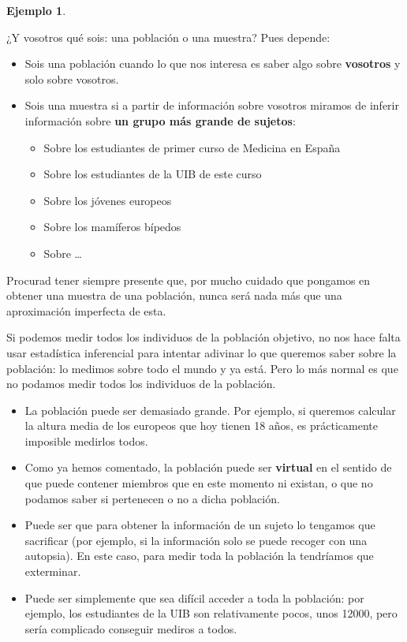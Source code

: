 \documentclass[
]{book}
\providecommand{\tightlist}{%
  \setlength{\itemsep}{0pt}\setlength{\parskip}{0pt}}
\theoremstyle{definition}
\theoremstyle{definition}
\newtheorem{example}{Ejemplo}[chapter]
\theoremstyle{definition}
\theoremstyle{definition}
\theoremstyle{remark}
\begin{document}
\begin{example}
\protect\hypertarget{exm:unnamed-chunk-58}{}\label{exm:unnamed-chunk-58}

¿Y vosotros qué sois: una población o una muestra? Pues depende:

\begin{itemize}
\item
  Sois una población cuando lo que nos interesa es saber algo sobre \textbf{vosotros} y solo sobre vosotros.
\item
  Sois una muestra si a partir de información sobre vosotros miramos de inferir información sobre \textbf{un grupo más grande de sujetos}:

  \begin{itemize}
  \tightlist
  \item
    Sobre los estudiantes de primer curso de Medicina en España
  \item
    Sobre los estudiantes de la UIB de este curso
  \item
    Sobre los jóvenes europeos
  \item
    Sobre los mamíferos bípedos
  \item
    Sobre \ldots{}
  \end{itemize}
\end{itemize}

\end{example}

\begin{rmdrecordau}
Procurad tener siempre presente que, por mucho cuidado que pongamos en obtener una muestra de una población, nunca será nada más que una aproximación imperfecta de esta.
\end{rmdrecordau}

Si podemos medir todos los individuos de la población objetivo, no nos hace falta usar estadística inferencial para intentar adivinar lo que queremos saber sobre la población: lo medimos sobre todo el mundo y ya está. Pero lo más normal es que no podamos medir todos los individuos de la población.

\begin{itemize}
\item
  La población puede ser demasiado grande. Por ejemplo, si queremos calcular la altura media de los europeos que hoy tienen 18 años, es prácticamente imposible medirlos todos.
\item
  Como ya hemos comentado, la población puede ser \textbf{virtual} en el sentido de que puede contener miembros que en este momento ni existan, o que no podamos saber si pertenecen o no a dicha población.
\item
  Puede ser que para obtener la información de un sujeto lo tengamos que sacrificar (por ejemplo, si la información solo se puede recoger con una autopsia). En este caso, para medir toda la población la tendríamos que exterminar.
\item
  Puede ser simplemente que sea difícil acceder a toda la población: por ejemplo, los estudiantes de la UIB son relativamente pocos, unos 12000, pero sería complicado conseguir mediros a todos.
\end{itemize}
\end{document}

